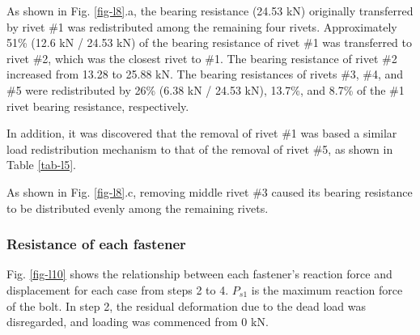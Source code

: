 As shown in Fig. \ref{fig-l8}.a, the bearing resistance (24.53 kN) originally transferred by rivet \#1 was redistributed among the remaining four rivets. Approximately 51\% (12.6 kN / 24.53 kN) of the bearing resistance of rivet \#1 was transferred to rivet \#2, which was the closest rivet to \#1. The bearing resistance of rivet \#2 increased from 13.28 to 25.88 kN. The bearing resistances of rivets \#3, \#4, and \#5 were redistributed by 26\% (6.38 kN / 24.53 kN), 13.7\%, and 8.7\% of the \#1 rivet bearing resistance, respectively.

In addition, it was discovered that the removal of rivet \#1 was based a similar load redistribution mechanism to that of the removal of rivet \#5, as shown in Table \ref{tab-l5}.

As shown in Fig. \ref{fig-l8}.c, removing middle rivet \#3 caused its bearing resistance to be distributed evenly among the remaining rivets.

\subsubsection{Resistance of each fastener}

Fig. \ref{fig-l10} shows the relationship between each fastener's reaction force and displacement for each case from steps 2 to 4. $P_{s1}$ is the maximum reaction force of the bolt. In step 2, the residual deformation due to the dead load was disregarded, and loading was commenced from 0 kN.

